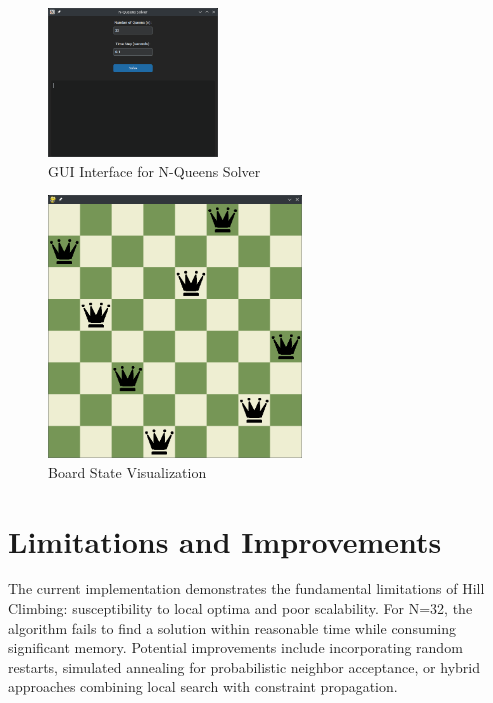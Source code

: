 \documentclass{report}
\begin{document}
	\begin{figure}[h]
		\centering
		\includegraphics[width=0.4\textwidth]{assets/gui.png}
		\caption{GUI Interface for N-Queens Solver}
		\label{fig:gui}
	\end{figure}
	
	
	
	\begin{figure}[h]
		\centering
		\includegraphics[width=0.6\textwidth]{assets/solver.png}
		\caption{Board State Visualization}
		\label{fig:visualizer}
	\end{figure}
	
	
	
	\section{Limitations and Improvements}
	The current implementation demonstrates the fundamental limitations of Hill Climbing: susceptibility to local optima and poor scalability. For N=32, the algorithm fails to find a solution within reasonable time while consuming significant memory. Potential improvements include incorporating random restarts, simulated annealing for probabilistic neighbor acceptance, or hybrid approaches combining local search with constraint propagation.
	
\end{document}
